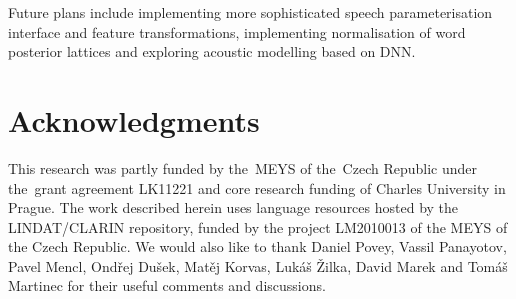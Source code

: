 Future plans include implementing more sophisticated speech parameterisation interface and feature transformations, implementing normalisation of word posterior lattices and exploring acoustic modelling based on \acl{DNN}.

\section*{Acknowledgments}
This research was partly funded by the~MEYS of the~Czech Republic under the~grant agreement LK11221 and core research funding of Charles University in Prague.
The work described herein uses language resources hosted by the LINDAT/CLARIN repository, funded by the project LM2010013 of the MEYS of the Czech Republic.
We would also like to thank Daniel Povey, Vassil Panayotov, Pavel Mencl, Ondřej Dušek, Matěj Korvas, Lukáš Žilka, David Marek and Tomáš Martinec for their useful comments and discussions.
